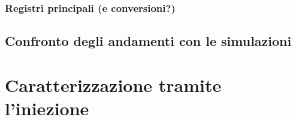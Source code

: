 \documentclass[10pt,a4paper,twoside]{report}
\begin{document}
\subsubsection{Registri principali (e conversioni?)}

\subsection{Confronto degli andamenti con le simulazioni}


\section{Caratterizzazione tramite l'iniezione}

\begin{comment}
Nel prototipo sotto studio, il chip W14R12, si sono rilevate fin da subito alcune problematiche legate ai pixel della matrice, sia per quel che riguarda la parte analogica che quella digitale.
In particolare, a differenza del suo predecessore TJ-Monopix1, TJ-Monopix2 è equipaggiato da un circuito che permette il \textit{tuning della threshold}, ossia di correggere, anche se di pochi DAC, la threshold di ciascun pixel, in modo da avere una threshold globale più uniforme possibile, o comunque con una dispersione piccola quanto possibile.

Preliminarmente però, è necessario studiare la distribuzione della threshold su tutta la matrice e noi abbiamo analizzato separatamente i 4 flavor, per poter anche studiare le loro principali differenze di funzionamento e performance.

Il fine ultimo di questa misura, è anche quello di riuscire a caratterizzare il comportamento di ciascun pixel, ad una carica iniettata equivalente all'energia tipica rilasciata dagli elettroni emessi dal decadimento di materiali radioattivi, e in particolare quelli dovuti alla cattura elettronica nel \ch{^55Fe}, le cui linee di emissione sono abbastanza piccate da permettere poi di confrontare i dati più facilmente. Come spiegato meglio nel paragrafo (?????), il \ch{^55Fe} ha una prima linea di emissione a  5.9 KeV che corrisponde in media all'incirca a 1616 $e^{-}$ generati (nel pixel?). Per questa ragione, nelle misure di iniezione è necessario, in base ai valori di conversione tra DAC ed $e^{-}$ SCRIVI, arrivare ad iniettare cariche in modo da studiare il comportamento dei pixel in queste regioni maggiormente interessanti. 
\end{comment}
\end{document}
